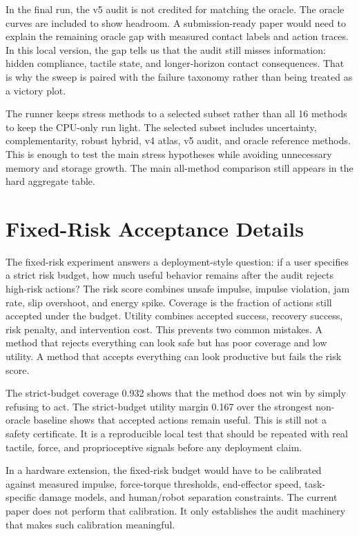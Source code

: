 \documentclass{article}
\begin{document}
In the final run, the v5 audit is not credited for matching the oracle. The oracle curves are included to show headroom. A submission-ready paper would need to explain the remaining oracle gap with measured contact labels and action traces. In this local version, the gap tells us that the audit still misses information: hidden compliance, tactile state, and longer-horizon contact consequences. That is why the sweep is paired with the failure taxonomy rather than being treated as a victory plot.

The runner keeps stress methods to a selected subset rather than all 16 methods to keep the CPU-only run light. The selected subset includes uncertainty, complementarity, robust hybrid, v4 atlas, v5 audit, and oracle reference methods. This is enough to test the main stress hypotheses while avoiding unnecessary memory and storage growth. The main all-method comparison still appears in the hard aggregate table.

\clearpage
\section{Fixed-Risk Acceptance Details}
The fixed-risk experiment answers a deployment-style question: if a user specifies a strict risk budget, how much useful behavior remains after the audit rejects high-risk actions? The risk score combines unsafe impulse, impulse violation, jam rate, slip overshoot, and energy spike. Coverage is the fraction of actions still accepted under the budget. Utility combines accepted success, recovery success, risk penalty, and intervention cost. This prevents two common mistakes. A method that rejects everything can look safe but has poor coverage and low utility. A method that accepts everything can look productive but fails the risk score.

The strict-budget coverage 0.932 shows that the method does not win by simply refusing to act. The strict-budget utility margin 0.167 over the strongest non-oracle baseline shows that accepted actions remain useful. This is still not a safety certificate. It is a reproducible local test that should be repeated with real tactile, force, and proprioceptive signals before any deployment claim.

In a hardware extension, the fixed-risk budget would have to be calibrated against measured impulse, force-torque thresholds, end-effector speed, task-specific damage models, and human/robot separation constraints. The current paper does not perform that calibration. It only establishes the audit machinery that makes such calibration meaningful.
\end{document}
